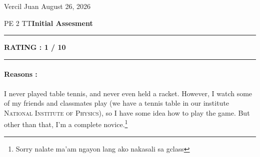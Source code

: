 \documentclass{article}
\begin{document}
	\noindent Vercil Juan \hfill August 26, 2026

	\noindent \textsc{PE 2 TT}\hfill \textbf{Initial Assesment}
	\vspace{1em}
	\hrule
	\begin{center}
	\textbf{RATING : 1 / 10}
	\end{center}
	\hrule
	\paragraph{Reasons :}
	I never played table tennis, and never even held a racket.
	However, I watch some of my friends and classmates play
	(we have a tennis table in our institute \textsc{National Institute of Physics}),
	so I have some idea how to play the game. But other than that, I'm a complete
	novice.\footnote{Sorry nalate ma'am ngayon lang ako nakasali sa gclass}
\end{document}

